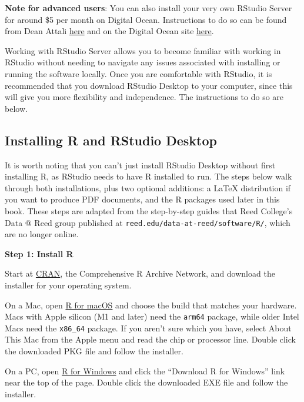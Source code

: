\documentclass[]{tufte-book}
\begin{document}
\textbf{Note for advanced users}: You can also install your very own RStudio Server for around \$5 per month on Digital Ocean. Instructions to do so can be found from Dean Attali \href{http://deanattali.com/2015/05/09/setup-rstudio-shiny-server-digital-ocean/}{here} and on the Digital Ocean site \href{https://www.digitalocean.com/community/tutorials/how-to-set-up-rstudio-on-an-ubuntu-cloud-server}{here}.

Working with RStudio Server allows you to become familiar with working in RStudio without needing to navigate any issues associated with installing or running the software locally. Once you are comfortable with RStudio, it is recommended that you download RStudio Desktop to your computer, since this will give you more flexibility and independence. The instructions to do so are below.

\subsection{Installing R and RStudio Desktop}\label{installing-r-and-rstudio-desktop}

It is worth noting that you can't just install RStudio Desktop without first installing R, as RStudio needs to have R installed to run. The steps below walk through both installations, plus two optional additions: a LaTeX distribution if you want to produce PDF documents, and the R packages used later in this book. These steps are adapted from the step-by-step guides that Reed College's Data @ Reed group published at \texttt{reed.edu/data-at-reed/software/R/}, which are no longer online.

\vspace*{0.2in}

\noindent\textbf{Step 1: Install R}\vspace*{0.1in}

Start at \href{https://cran.r-project.org}{CRAN}, the Comprehensive R Archive Network, and download the installer for your operating system.

On a Mac, open \href{https://cran.r-project.org/bin/macosx/}{R for macOS} and choose the build that matches your hardware. Macs with Apple silicon (M1 and later) need the \texttt{arm64} package, while older Intel Macs need the \texttt{x86\_64} package. If you aren't sure which you have, select About This Mac from the Apple menu and read the chip or processor line. Double click the downloaded PKG file and follow the installer.

On a PC, open \href{https://cran.r-project.org/bin/windows/base/}{R for Windows} and click the ``Download R for Windows'' link near the top of the page. Double click the downloaded EXE file and follow the installer.
\end{document}

